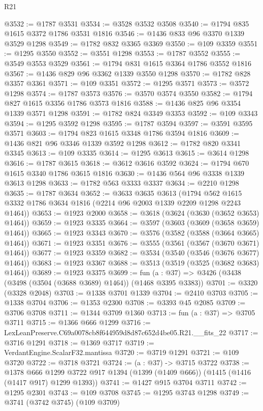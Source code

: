 \begin{lexlean}{R21}
\begin{coremodule}
@3532 := @1787 @3531
@3534 := @3528 @3532 @3508
@3540 := @1794 @835 @1615 @3372 @1786 @3531 @1816
@3546 := @1436 @833 @96 @3370 @1339 @3529 @1298
@3549 := @1782 @832 @3365 @3369
@3550 := @109 @3359
@3551 := @1295 @3550
@3552 := @3551 @1298
@3553 := @1787 @3552
@3555 := @3549 @3553 @3529
@3561 := @1794 @831 @1615 @3364 @1786 @3552 @1816
@3567 := @1436 @829 @96 @3362 @1339 @3550 @1298
@3570 := @1782 @828 @3357 @3361
@3571 := @109 @3351
@3572 := @1295 @3571
@3573 := @3572 @1298
@3574 := @1787 @3573
@3576 := @3570 @3574 @3550
@3582 := @1794 @827 @1615 @3356 @1786 @3573 @1816
@3588 := @1436 @825 @96 @3354 @1339 @3571 @1298
@3591 := @1782 @824 @3349 @3353
@3592 := @109 @3343
@3594 := @1295 @3592 @1298
@3595 := @1787 @3594
@3597 := @3591 @3595 @3571
@3603 := @1794 @823 @1615 @3348 @1786 @3594 @1816
@3609 := @1436 @821 @96 @3346 @1339 @3592 @1298
@3612 := @1782 @820 @3341 @3345
@3613 := @109 @3335
@3614 := @1295 @3613
@3615 := @3614 @1298
@3616 := @1787 @3615
@3618 := @3612 @3616 @3592
@3624 := @1794 @670 @1615 @3340 @1786 @3615 @1816
@3630 := @1436 @564 @96 @3338 @1339 @3613 @1298
@3633 := @1782 @563 @3333 @3337
@3634 := @2210 @1298
@3635 := @1787 @3634
@3652 := @3633
    @3635
    @3613
    (@1794 @562 @1615 @3332 @1786 @3634 @1816 (@2214 @96 @2003 @1339 @2209 @1298 @2243 @1464))
@3653 := @1923 @2000
@3658 := @3618 (@3624 (@3630 (@3652 @3653) @1464))
@3659 := @1923 @3335
@3664 := @3597 (@3603 (@3609 (@3658 @3659) @1464))
@3665 := @1923 @3343
@3670 := @3576 (@3582 (@3588 (@3664 @3665) @1464))
@3671 := @1923 @3351
@3676 := @3555 (@3561 (@3567 (@3670 @3671) @1464))
@3677 := @1923 @3359
@3682 := @3534 (@3540 (@3546 (@3676 @3677) @1464))
@3683 := @1923 @3367
@3688 := @3513 (@3519 (@3525 (@3682 @3683) @1464))
@3689 := @1923 @3375
@3699 := fun (a : @37) => @3426 (@3438 (@3498 (@3504 (@3688 @3689) @1464)) (@1468 @3395 @3383))
@3701 := @3320 (@3328 @2048)
@3703 := @1338 @3701 @1339
@3704 := @2410 @3703
@3705 := @1338 @3704
@3706 := @1353 @2300
@3708 := @3393 @45 @2085
@3709 := @3706 @3708
@3711 := @1344 @3709 @1360
@3713 := fun (a : @37) => @3705 @3711
@3715 := @1366 @666 @1299
@3716 := LexLeanPreserve.C69a0078cb8f644959d8d87c652d4be05.R21.__fits_22
@3717 := @3716 @1291
@3718 := @1369 @3717
@3719 := VerdantEngine.ScalarF32.mantissa
@3720 := @3719 @1291
@3721 := @109 @3720
@3722 := @3718 @3721
@3724 := (a : @37) -> @3715 @3722
@3738 := @1378
    @666
    @1299
    @3722
    @917
    @1394
    (@1399 (@1409 @666))
    (@1415 (@1416 (@1417 @917) @1299 @1393))
@3741 := @1427 @915 @3704 @3711
@3742 := @1295 @2301
@3743 := @109 @3708
@3745 := @1295 @3743 @1298
@3749 := @3741 (@3742 @3745) (@109 @3709)

\end{coremodule}
\end{lexlean}
